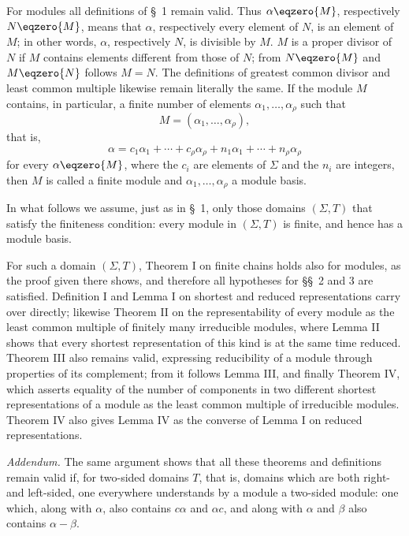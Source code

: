 \documentclass[11pt]{article}
\begin{document}
For modules all definitions of \S~1 remain valid. Thus $\alpha\eqzero{M}$, respectively $N\eqzero{M}$, means that $\alpha$, respectively every element of $N$, is an element of $M$; in other words, $\alpha$, respectively $N$, is divisible by $M$. $M$ is a proper divisor of $N$ if $M$ contains elements different from those of $N$; from $N\eqzero{M}$ and $M\eqzero{N}$ follows $M=N$. The definitions of greatest common divisor and least common multiple likewise remain literally the same. If the module $M$ contains, in particular, a finite number of elements $\alpha_1,
\ldots,\alpha_\rho$ such that
\[
 M=(\alpha_1,
\ldots,\alpha_\rho),
\]
that is,
\[
 \alpha=c_1\alpha_1+\cdots+c_\rho\alpha_\rho+n_1\alpha_1+\cdots+n_\rho\alpha_\rho
\]
for every $\alpha\eqzero{M}$, where the $c_i$ are elements of $\Sigma$ and the $n_i$ are integers, then $M$ is called a finite module and $\alpha_1,
\ldots,\alpha_\rho$ a module basis.

In what follows we assume, just as in \S~1, only those domains $(\Sigma,T)$ that satisfy the finiteness condition: every module in $(\Sigma,T)$ is finite, and hence has a module basis.

For such a domain $(\Sigma,T)$, Theorem I on finite chains holds also for modules, as the proof given there shows, and therefore all hypotheses for \S\S~2 and 3 are satisfied. Definition I and Lemma I on shortest and reduced representations carry over directly; likewise Theorem II on the representability of every module as the least common multiple of finitely many irreducible modules, where Lemma II shows that every shortest representation of this kind is at the same time reduced. Theorem III also remains valid, expressing reducibility of a module through properties of its complement; from it follows Lemma III, and finally Theorem IV, which asserts equality of the number of components in two different shortest representations of a module as the least common multiple of irreducible modules. Theorem IV also gives Lemma IV as the converse of Lemma I on reduced representations.

\emph{Addendum.} The same argument shows that all these theorems and definitions remain valid if, for two-sided domains $T$, that is, domains which are both right- and left-sided, one everywhere understands by a module a two-sided module: one which, along with $\alpha$, also contains $c\alpha$ and $\alpha c$, and along with $\alpha$ and $\beta$ also contains $\alpha-\beta$.
\end{document}
